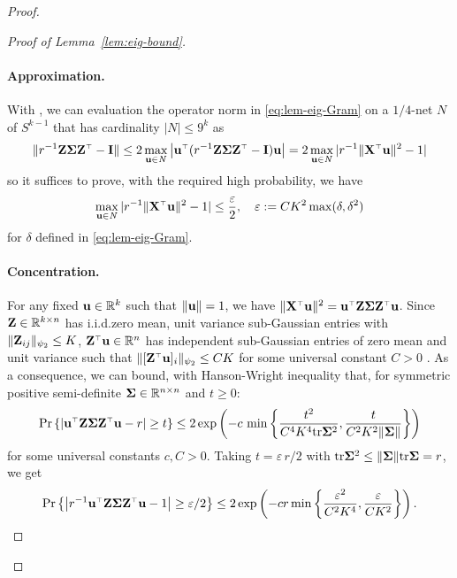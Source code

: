 \documentclass[11pt]{article}
\begin{document}
\begin{proof}
\begin{proof}[Proof of Lemma~\ref{lem:eig-bound}]
\paragraph{Approximation.} With \cite[Corollary~4.2.13]{vershynin2018high}, we can evaluation the operator norm in \eqref{eq:lem-eig-Gram} on a $1/4$-net $\mathit N$ of $S^{k-1} $ that has cardinality $|\mathit N| \le 9^k$ as
\[
  \| r^{-1} \Z \Sigmab \Z^\top - \I \| \le 2 \max_{\u \in \mathit N} \left| \u^\top (r^{-1} \Z \Sigmab \Z^\top - \I) \u \right| = 2 \max_{\u \in \mathit N} | r^{-1} \| \X^\top \u \|^2 - 1 |
\]
so it suffices to prove, with the required high probability, we have
\[
  \max_{\u \in \mathit N} | r^{-1} \| \X^\top \u \|^2 - 1 | \leq \frac{\varepsilon}2, \quad \varepsilon := C K^2  \max(\delta, \delta^2) %
\]
for $\delta$ defined in \eqref{eq:lem-eig-Gram}.

\paragraph{Concentration.} For any fixed $\mathbf u \in \mathbb R^k$ such that $\| \mathbf u \| =1$, we have $\| \X^\top \u \|^2 = \u^\top \Z \Sigmab \Z^\top \u$. Since $\mathbf Z \in \mathbb R^{k \times n}$ has i.i.d.\@ zero mean, unit variance sub-Gaussian entries with $\| \mathbf Z_{ij} \|_{\psi_2} \le K$, $\Z^\top \u \in \R^n$ has independent sub-Gaussian entries of zero mean and unit variance such that $\| [\Z^\top \u]_i \|_{\psi_2} \le C K$ for some universal constant $C > 0$ \cite[Proposition~2.6.1]{vershynin2018high}. As a consequence, we can bound, with Hanson-Wright inequality that, for symmetric positive semi-definite $\mathbf{\Sigma} \in \mathbb R^{n \times n}$ and $t \ge 0$:
\[
  \Pr \left\{ \left| \u^\top \Z \Sigmab \Z^\top \u - r  \right| \ge t \right\} \le 2 \exp \left( - c\,\min \left\{ \frac{t^2}{C^4 K^4 \tr\Sigmab^2 },  \frac{t}{C^2 K^2 \| \Sigmab \| } \right\} \right)
\]
for some universal constants $c, C > 0$. Taking $t = \varepsilon\,r/2$ with $\mathrm{tr} \mathbf{\Sigma}^2 \le \| \mathbf{\Sigma} \| \mathrm{tr} \mathbf{\Sigma} = r$, we get
\begin{equation}
  \Pr \left\{ \left| r^{-1} \u^\top \Z \Sigmab \Z^\top \u - 1  \right| \ge \varepsilon/2 \right\} \le 2 \exp \left( - c r \min \left\{ \frac{ \varepsilon^2 }{C^2 K^4 },  \frac{\varepsilon}{C K^2 } \right\} \right).
\end{equation}


\end{proof}
\end{proof}
\end{document}
